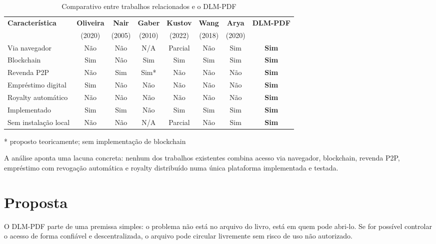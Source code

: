 \documentclass[12pt]{article}
\begin{document}
\begin{table}[H]
\centering
\caption{Comparativo entre trabalhos relacionados e o DLM-PDF}
\label{tab:relacionados}
\begin{tabular}{|l|c|c|c|c|c|c|c|}
\hline
\textbf{Característica}  & \textbf{Oliveira} & \textbf{Nair}  & \textbf{Gaber} & \textbf{Kustov} & \textbf{Wang}  & \textbf{Arya}  & \textbf{DLM-PDF} \\
                         & (2020)            & (2005)         & (2010)         & (2022)          & (2018)         & (2020)         & \\
\hline
Via navegador            & Não    & Não    & N/A    & Parcial & Não    & Sim    & \textbf{Sim}  \\
\hline
Blockchain               & Sim    & Não    & Sim    & Sim     & Sim    & Sim    & \textbf{Sim}  \\
\hline
Revenda P2P              & Não    & Sim    & Sim*   & Não     & Não    & Não    & \textbf{Sim}  \\
\hline
Empréstimo digital       & Sim    & Não    & Não    & Não     & Não    & Não    & \textbf{Sim}  \\
\hline
Royalty automático       & Não    & Não    & Não    & Não     & Não    & Não    & \textbf{Sim}  \\
\hline
Implementado             & Sim    & Sim    & Não    & Sim     & Sim    & Sim    & \textbf{Sim}  \\
\hline
Sem instalação local     & Não    & Não    & N/A    & Parcial & Não    & Sim    & \textbf{Sim}  \\
\hline
\end{tabular}

\medskip
\footnotesize{* proposto teoricamente; sem implementação de blockchain}
\end{table}

A análise aponta uma lacuna concreta: nenhum dos trabalhos existentes combina acesso via navegador, blockchain, revenda P2P, empréstimo com revogação automática e royalty distribuído numa única plataforma implementada e testada.

\section{Proposta}

O DLM-PDF parte de uma premissa simples: o problema não está no arquivo do livro, está em quem pode abri-lo. Se for possível controlar o acesso de forma confiável e descentralizada, o arquivo pode circular livremente sem risco de uso não autorizado.
\end{document}
